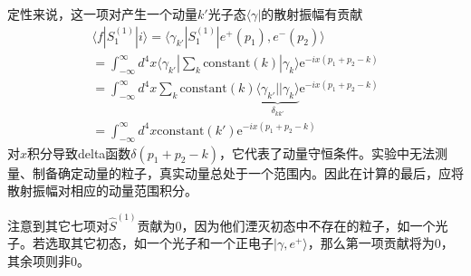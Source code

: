 定性来说，这一项对产生一个动量$k'$光子态$\langle \gamma|$的散射振幅有贡献
\begin{gather}\label{equ9.74}
\langle f|S^{(1)}_1|i\rangle = \langle \gamma_{k'}|S^{(1)}_1|e^+(p_1),e^-(p_2)\rangle\\
=\int_{-\infty}^\infty d^4x\langle\gamma_{k'}|\sum_k\text{constant}(k)|\gamma_k\rangle \text{e}^{-ix(p_1+p_2-k)}\nonumber\\
=\int_{-\infty}^\infty d^4x\sum_k\text{constant}(k)\underbrace{\langle\gamma_{k'}||\gamma_k\rangle}_{\delta_{kk'}} \text{e}^{-ix(p_1+p_2-k)}\nonumber\\
=\int_{-\infty}^{\infty} d^4x \text{constant}(k')\text{e}^{-ix(p_1+p_2-k)}\nonumber
\end{gather}
对$x$积分导致delta函数$\delta(p_1+p_2-k)$，它代表了动量守恒条件。实验中无法测量、制备确定动量的粒子，真实动量总处于一个范围内。因此在计算的最后，应将散射振幅对相应的动量范围积分。

注意到其它七项对$\hat{S}^(1)$贡献为0，因为他们湮灭初态中不存在的粒子，如一个光子。若选取其它初态，如一个光子和一个正电子$|\gamma,e^+\rangle$，那么第一项贡献将为0，其余项则非0。

